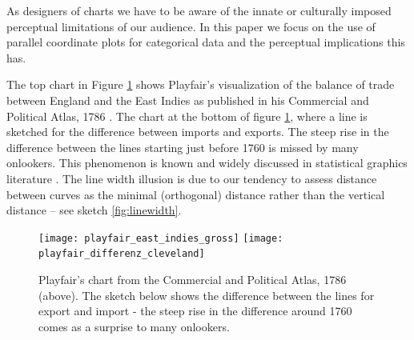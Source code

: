As designers of charts we have to be aware of the innate or culturally imposed perceptual limitations of our audience.
%
In this paper we focus on the use of parallel coordinate plots \citep{pcp:1885, inselberg:1985, wegman:1990} for categorical data and the perceptual implications this has.


The top chart in Figure \ref{playfair} shows Playfair's  visualization of the balance of trade between England and the East Indies as published in his Commercial and Political Atlas, 1786 \cite{playfair, playfair2}. The chart at the bottom of  figure \ref{playfair}, where a line is sketched for the difference between imports and exports. The steep rise in the difference between the lines starting just before 1760 is missed by many onlookers. This phenomenon  is known and widely discussed in statistical graphics literature \citep{cleveland:1984, wainer:2000, robbins:2005}. The line width illusion is due to our  tendency to assess distance between curves as the minimal (orthogonal) distance rather than the  vertical distance -- see sketch \ref{fig:linewidth}.




\begin{figure}
\texttt{[image: playfair\_east\_indies\_gross]}
\texttt{[image: playfair\_differenz\_cleveland]}
\caption{Playfair's chart from the Commercial and Political Atlas, 1786 (above). The sketch below shows  the difference between the lines for export and import - the steep rise in the difference around 1760  comes as a surprise to many onlookers.  }
\label{playfair}
\end{figure}

